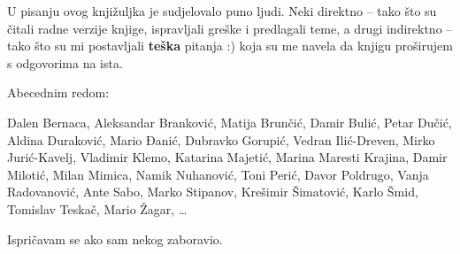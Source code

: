 
U pisanju ovog knjižuljka je sudjelovalo puno ljudi.
Neki direktno -- tako što su čitali radne verzije knjige, ispravljali greške i predlagali teme, a drugi indirektno -- tako što su mi postavljali \textbf{teška} pitanja :) koja su me navela da knjigu proširujem s odgovorima na ista.

Abecednim redom:

Dalen Bernaca,
Aleksandar Branković,
Matija Brunčić,
Damir Bulić,
Petar Dučić,
Aldina Duraković,
Mario Đanić,
Dubravko Gorupić,
Vedran Ilić-Dreven,
Mirko Jurić-Kavelj,
Vladimir Klemo,
Katarina Majetić,
Marina Maresti Krajina,
Damir Milotić, 
Milan Mimica,
Namik Nuhanović,
Toni Perić,
Davor Poldrugo,
Vanja Radovanović,
Ante Sabo,
Marko Stipanov,
Krešimir Šimatović,
Karlo Šmid,
Tomislav Teskač,
Mario Žagar,
\dots

Ispričavam se ako sam nekog zaboravio.
